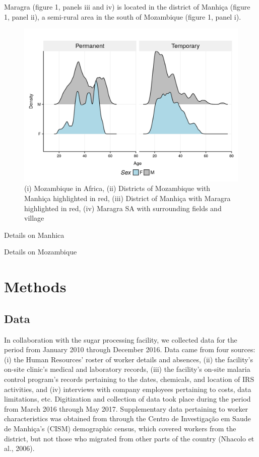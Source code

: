\documentclass[]{article}
\begin{document}
Maragra (figure 1, panels iii and iv) is located in the district of
Manhiça (figure 1, panel ii), a semi-rural area in the south of
Mozambique (figure 1, panel i).

\begin{figure}[H]

{\centering \includegraphics{figures/unnamed-chunk-13-1} 

}

\caption{(i) Mozambique in Africa, (ii) Districts of Mozambique with Manhiça highlighted in red, (iii) District of Manhiça with Maragra highlighted in red, (iv) Maragra SA with surrounding fields and village}\label{fig:unnamed-chunk-13}
\end{figure}

Details on Manhica

Details on Mozambique

\section{Methods}\label{methods}

\subsection{Data}\label{data}

In collaboration with the sugar processing facility, we collected data
for the period from January 2010 through December 2016. Data came from
four sources: (i) the Human Resources' roster of worker details and
absences, (ii) the facility's on-site clinic's medical and laboratory
records, (iii) the facility's on-site malaria control program's records
pertaining to the dates, chemicals, and location of IRS activities, and
(iv) interviews with company employees pertaining to costs, data
limitations, etc. Digitization and collection of data took place during
the period from March 2016 through May 2017. Supplementary data
pertaining to worker characteristics was obtained from through the
Centro de Investigação em Saude de Manhiça's (CISM) demographic census,
which covered workers from the district, but not those who migrated from
other parts of the country (Nhacolo et al., 2006).
\end{document}

